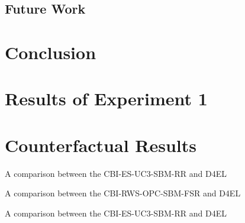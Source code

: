 \documentclass[12pt,a4paper]{report}
\begin{document}
\section{Future Work}








\chapter{Conclusion}
\label{ch:conclusion}


\begin{appendices}
    \chapter{Results of Experiment 1}
    \begin{table}
        
    \label{app:avg-viability}
    \end{table}


    \chapter{Counterfactual Results}
  \begin{table}
      \centering    
      \resizebox{\linewidth}{!}{
      
      }
      \caption{A comparison between the CBI-ES-UC3-SBM-RR and D4EL}
  \end{table}
  \begin{table}
      \centering    
      \resizebox{\linewidth}{!}{
      
      
      }
  \caption{A comparison between the CBI-RWS-OPC-SBM-FSR and D4EL}
  \end{table}
  \begin{table}
      \centering    
      \resizebox{\linewidth}{!}{
      
      }
      \caption{A comparison between the CBI-ES-UC3-SBM-RR and D4EL}
  \end{table}
  \begin{table}
      \centering    
      \resizebox{\linewidth}{!}{
      
      
}
\end{table}
\end{appendices}
\end{document}
